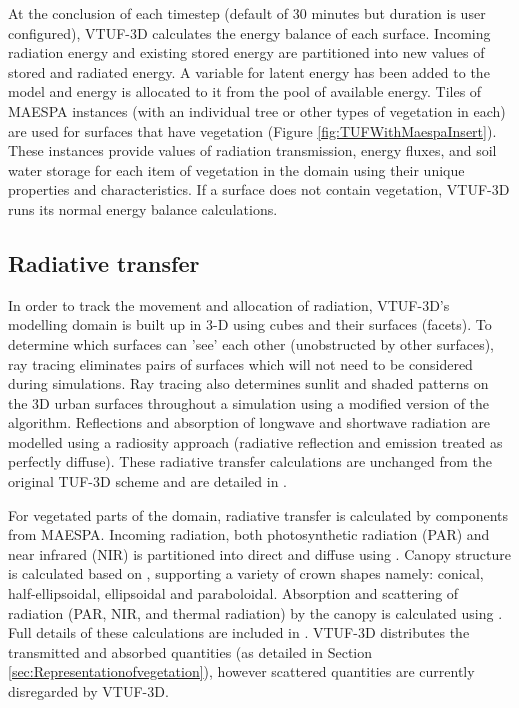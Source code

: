 \documentclass[final,3p,times,authoryear]{elsarticle}
\begin{document}
At the conclusion of each timestep (default of 30 minutes but duration is user configured), VTUF-3D calculates the energy balance of each surface. Incoming radiation energy and existing stored energy are partitioned into new values of stored and radiated energy. A variable for latent energy has been added to the model and energy is allocated to it from the pool of available energy. Tiles of MAESPA instances (with an individual tree or other types of vegetation in each) are used for surfaces that have vegetation (Figure \ref{fig:TUFWithMaespaInsert}). These instances provide values of radiation transmission, energy fluxes, and soil water storage for each item of vegetation in the domain using their unique properties and characteristics. If a surface does not contain vegetation, VTUF-3D runs its normal energy balance calculations.



\subsection{Radiative transfer}\label{sec:radiativetransfer}

In order to track the movement and allocation of radiation, VTUF-3D’s modelling domain is built up in 3-D using cubes and their surfaces (facets). To determine which surfaces can 'see' each other (unobstructed by other surfaces), ray tracing eliminates pairs of surfaces which will not need to be considered during simulations. Ray tracing also determines sunlit and shaded patterns on the 3D urban surfaces throughout a simulation using a modified version of the \cite{Soux2004} algorithm. Reflections and absorption of longwave and shortwave radiation are modelled using a radiosity approach (radiative reflection and emission treated as perfectly diffuse). These radiative transfer calculations are unchanged from the original TUF-3D scheme and are detailed in \cite{Krayenhoff2007}.

For vegetated parts of the domain, radiative transfer is calculated by components from MAESPA. Incoming radiation, both photosynthetic radiation (PAR) and near infrared (NIR) is partitioned into direct and diffuse using \cite{Weiss1985}. Canopy structure is calculated based on \cite{Wang1990}, supporting a variety of crown shapes namely: conical, half-ellipsoidal, ellipsoidal and paraboloidal. Absorption and scattering of radiation (PAR, NIR, and thermal radiation) by the canopy is calculated using \cite{Norman1979}. Full details of these calculations are included in \cite{Duursma2012}. VTUF-3D distributes the transmitted and absorbed quantities (as detailed in Section \ref{sec:Representationofvegetation}), however scattered quantities are currently disregarded by VTUF-3D.
\end{document}

